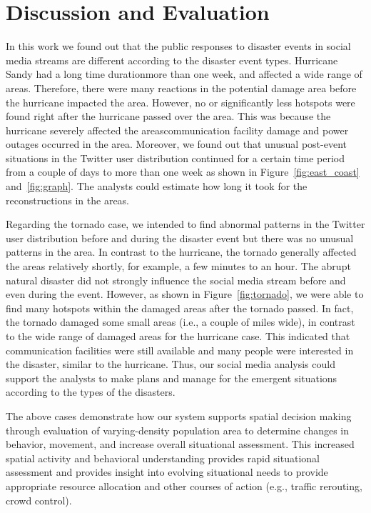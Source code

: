 
\section{Discussion and Evaluation}
\label{sec:discussion}
%
In this work we found out that the public responses to disaster events in social media streams are different according to the disaster event types.
Hurricane Sandy had a long time duration\textemdash more than one week, and affected a wide range of areas.
Therefore, there were many reactions in the potential damage area before the hurricane impacted the area.
However, no or significantly less hotspots were found right after the hurricane passed over the area.
This was because the hurricane severely affected the areas\textemdash communication facility damage and power outages occurred in the area.
Moreover, we found out that unusual post-event situations in the Twitter user distribution continued for a certain time period from a couple of days to more than one week as shown in Figure~\ref{fig:east_coast} and~\ref{fig:graph}.
The analysts could estimate how long it took for the reconstructions in the areas.

Regarding the tornado case, we intended to find abnormal patterns in the Twitter user distribution before and during the disaster event
but there was no unusual patterns in the area.
In contrast to the hurricane, the tornado generally affected the areas relatively shortly, for example, a few minutes to an hour.
The abrupt natural disaster did not strongly influence the social media stream before and even during the event.
However, as shown in Figure~\ref{fig:tornado}, we were able to find many hotspots within the damaged areas after the tornado passed.
In fact, the tornado damaged some small areas (i.e., a couple of miles wide), in contrast to the wide range of damaged areas for the hurricane case.
This indicated that communication facilities were still available and many people were interested in the disaster, similar to the hurricane.
Thus, our social media analysis could support the analysts to make plans and manage for the emergent situations according to the types of the disasters.

The above cases demonstrate how our system supports spatial decision making through evaluation of varying-density population area to determine changes in behavior, movement, and increase overall situational assessment. This increased spatial activity and behavioral understanding provides rapid situational assessment and provides insight into evolving situational needs to provide appropriate resource allocation and other courses of action (e.g., traffic rerouting, crowd control).

